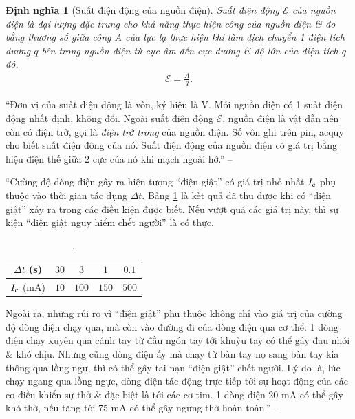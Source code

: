 \documentclass[oneside]{book}
\numberwithin{equation}{section}
\newtheorem{dinhnghia}{Định nghĩa}[section]
\begin{document}
\begin{dinhnghia}[Suất điện động của nguồn điện]
	\emph{Suất điện động $\mathcal{E}$ của nguồn điện} là đại lượng đặc trưng cho khả năng thực hiện công của nguồn điện \& đo bằng thương số giữa công $A$ của lực lạ thực hiện khi làm dịch chuyển 1 điện tích dương $q$ bên trong nguồn điện từ cực âm đến cực dương \& độ lớn của điện tích $q$ đó.
	\begin{align}
		\mathcal{E} = \frac{A}{q}.
	\end{align}
\end{dinhnghia}
``Đơn vị của suất điện động là vôn, ký hiệu là V. Mỗi nguồn điện có 1 suất điện động nhất định, không đổi. Ngoài suất điện động $\mathcal{E}$, nguồn điện là vật dẫn nên còn có điện trở, gọi là \textit{điện trở trong} của nguồn điện. Số vôn ghi trên pin, acquy cho biết suất điện động của nó. Suất điện động của nguồn điện có giá trị bằng hiệu điện thế giữa 2 cực của nó khi mạch ngoài hở.'' -- \cite[pp. 50--51]{SGK_Vat_Ly_11_nang_cao}

``Cường độ dòng điện gây ra hiện tượng ``điện giật'' có giá trị nhỏ nhất $I_{\rm c}$ phụ thuộc vào thời gian tác dụng $\Delta t$. Bảng \ref{tab:cuong do dien giat} là kết quả đã thu được khi có ``điện giật'' xảy ra trong các điều kiện được biết. Nếu vượt quá các giá trị này, thì sự kiện ``điện giật nguy hiểm chết người'' là có thực.

\begin{table}[H]
	\centering
	\begin{tabular}{|c|c|c|c|c|}
		\hline
		$\Delta t$ (s) & $30$ & $3$ & $1$ & $0.1$ \\
		\hline
		$I_{\rm c}$ (mA) & $10$ & $100$ & $150$ & $500$ \\
		\hline
	\end{tabular}
	\caption{\cite[Bảng 10.2, p. 52]{SGK_Vat_Ly_11_nang_cao}.}
	\label{tab:cuong do dien giat}
\end{table}
Ngoài ra, những rủi ro vì ``điện giật'' phụ thuộc không chỉ vào giá trị của cường độ dòng điện chạy qua, mà còn vào đường đi của dòng điện qua cơ thể. 1 dòng điện chạy xuyên qua cánh tay từ đầu ngón tay tới khuỷu tay có thể gây đau nhói \& khó chịu. Nhưng cũng dòng điện ấy mà chạy từ bàn tay nọ sang bàn tay kia thông qua lồng ngự, thì có thể gây tai nạn ``điện giật'' chết người. Lý do là, lúc chạy ngang qua lồng ngực, dòng điện tác động trực tiếp tới sự hoạt động của các cơ điều khiển sự thở \& đặc biệt là tới các cơ tim. 1 dòng điện 20 mA có thể gây khó thở, nếu tăng tới 75 mA có thể gây ngưng thở hoàn toàn.'' -- \cite[p. 52]{SGK_Vat_Ly_11_nang_cao}
\end{document}
